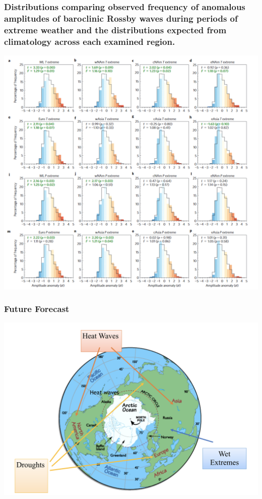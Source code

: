 \documentclass[12pt]{beamer}
\begin{document}
\begin{frame}
\frametitle{Distributions comparing observed frequency of anomalous amplitudes of baroclinic Rossby waves during periods of extreme weather and the distributions expected from climatology across each examined region.}
\centering\includegraphics[scale=0.3]{Cathie7}
\end{frame}
\begin{frame}
\frametitle{Future Forecast}
\centering
\includegraphics[scale=0.3]{Cathie8}


\end{frame}
\end{document}
